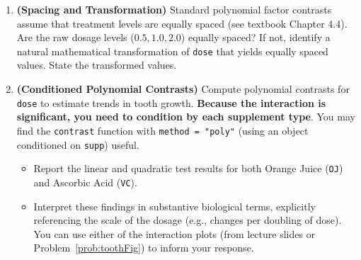\documentclass[10pt,twoside]{article}\usepackage[]{graphicx}\usepackage[dvipsnames,svgnames,table]{xcolor}
\begin{document}
\begin{enumerate}
\begin{enumerate}
  \item \textbf{(Spacing and Transformation)} Standard polynomial factor contrasts assume that treatment levels are equally spaced (see textbook Chapter 4.4). 
  Are the raw dosage levels ($0.5, 1.0, 2.0$) equally spaced? If not, identify a natural mathematical transformation of \texttt{dose} that yields equally spaced values. State the transformed values.

  \item \textbf{(Conditioned Polynomial Contrasts)} Compute polynomial contrasts for \texttt{dose} to estimate trends in tooth growth. \textbf{Because the interaction is significant, you need to condition by each supplement type}. You may find the \texttt{contrast} function with \texttt{method = "poly"} (using an object conditioned on \texttt{supp}) useful.
    \begin{itemize}
    \item Report the linear and quadratic test results for both Orange Juice (\texttt{OJ}) and Ascorbic Acid (\texttt{VC}). 
    \item Interpret these findings in substantive biological terms, explicitly referencing the scale of the dosage (e.g., changes per doubling of dose). You can use either of the interaction plots (from lecture slides or Problem~\ref{prob:toothFig}) to inform your response.
    \end{itemize}
  \end{enumerate}
\end{enumerate}
\end{document}
